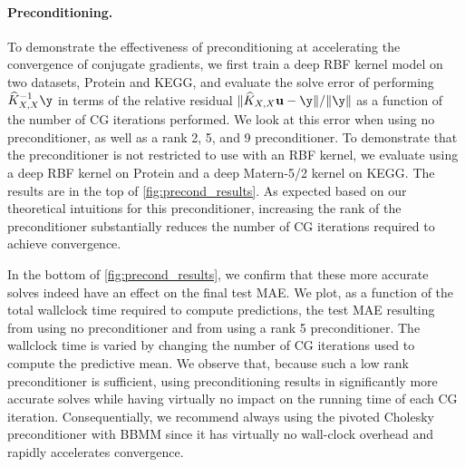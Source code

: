 \paragraph{Preconditioning.}
To demonstrate the effectiveness of preconditioning at accelerating the convergence of conjugate gradients, we first train a deep RBF kernel model on two datasets, Protein and KEGG, and evaluate the solve error of performing $\trainK^{-1}\y$ in terms of the relative residual $\Vert \trainK\bu - \y \Vert / \Vert \y \Vert$ as a function of the number of CG iterations performed.
We look at this error when using no preconditioner, as well as a rank 2, 5, and 9 preconditioner.
To demonstrate that the preconditioner is not restricted to use with an RBF kernel, we evaluate using a deep RBF kernel on Protein and a deep Matern-5/2 kernel on KEGG.
The results are in the top of \autoref{fig:precond_results}.
As expected based on our theoretical intuitions for this preconditioner, increasing the rank of the preconditioner substantially reduces the number of CG iterations required to achieve convergence.

In the bottom of \autoref{fig:precond_results}, we confirm that these more accurate solves indeed have an effect on the final test MAE.
We plot, as a function of the total wallclock time required to compute predictions, the test MAE resulting from using no preconditioner and from using a rank 5 preconditioner.
The wallclock time is varied by changing the number of CG iterations used to compute the predictive mean.
We observe that, because such a low rank preconditioner is sufficient, using preconditioning results in significantly more accurate solves while having virtually no impact on the running time of each CG iteration.
Consequentially, we recommend always using the pivoted Cholesky preconditioner with BBMM since it has virtually no wall-clock overhead and rapidly accelerates convergence.
